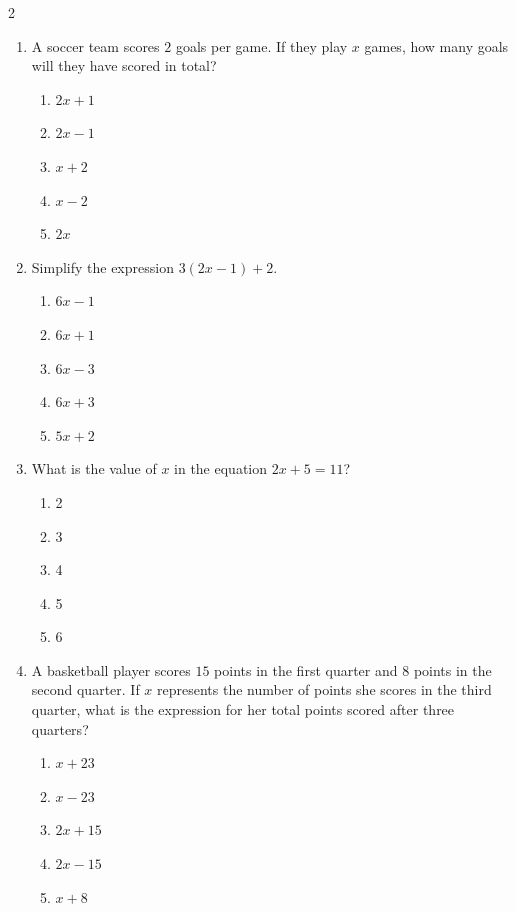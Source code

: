 \documentclass[10pt]{article}
\begin{document}
\begin{multicols}{2}
\begin{enumerate}[label=\textbf{Q\arabic*.}, leftmargin=*, itemsep=6pt, parsep=0pt]
  \item \small A soccer team scores $2$ goals per game. If they play $x$ games, how many goals will they have scored in total?
  \begin{enumerate}[label=(\Alph*), leftmargin=0.6cm, nosep, itemsep=2pt]
    \item $2x + 1$
    \item $2x - 1$
    \item $x + 2$
    \item $x - 2$
    \item $2x$
  \end{enumerate}

  \item \small Simplify the expression $3(2x - 1) + 2$.
  \begin{enumerate}[label=(\Alph*), leftmargin=0.6cm, nosep, itemsep=2pt]
    \item $6x - 1$
    \item $6x + 1$
    \item $6x - 3$
    \item $6x + 3$
    \item $5x + 2$
  \end{enumerate}

  \item \small What is the value of $x$ in the equation $2x + 5 = 11$?
  \begin{enumerate}[label=(\Alph*), leftmargin=0.6cm, nosep, itemsep=2pt]
    \item 2
    \item 3
    \item 4
    \item 5
    \item 6
  \end{enumerate}

  \item \small A basketball player scores $15$ points in the first quarter and $8$ points in the second quarter. If $x$ represents the number of points she scores in the third quarter, what is the expression for her total points scored after three quarters?
  \begin{enumerate}[label=(\Alph*), leftmargin=0.6cm, nosep, itemsep=2pt]
    \item $x + 23$
    \item $x - 23$
    \item $2x + 15$
    \item $2x - 15$
    \item $x + 8$
  \end{enumerate}


\end{enumerate}
\end{multicols}
\end{document}

